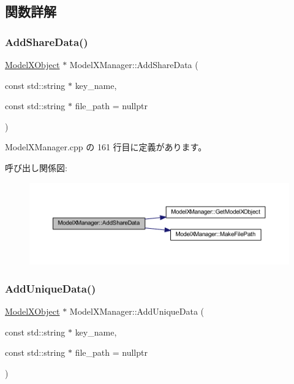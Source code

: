 \subsection{関数詳解}
\mbox{\label{class_model_x_manager_a395565622dff14d4ff80bf64611f9a36}} 
\subsubsection{\texorpdfstring{Add\+Share\+Data()}{AddShareData()}}
{\footnotesize\ttfamily \mbox{\hyperlink{class_model_x_object}{Model\+X\+Object}} $\ast$ Model\+X\+Manager\+::\+Add\+Share\+Data (\begin{DoxyParamCaption}\item[{const std\+::string $\ast$}]{key\+\_\+name,  }\item[{const std\+::string $\ast$}]{file\+\_\+path = {\ttfamily nullptr} }\end{DoxyParamCaption})\hspace{0.3cm}{\ttfamily [static]}}



 Model\+X\+Manager.\+cpp の 161 行目に定義があります。

呼び出し関係図\+:\nopagebreak
\begin{figure}[H]
\begin{center}
\leavevmode
\includegraphics[width=350pt]{class_model_x_manager_a395565622dff14d4ff80bf64611f9a36_cgraph}
\end{center}
\end{figure}
\mbox{\label{class_model_x_manager_a0a0cd728e7b92de6c18e96026708d97b}} 
\subsubsection{\texorpdfstring{Add\+Unique\+Data()}{AddUniqueData()}}
{\footnotesize\ttfamily \mbox{\hyperlink{class_model_x_object}{Model\+X\+Object}} $\ast$ Model\+X\+Manager\+::\+Add\+Unique\+Data (\begin{DoxyParamCaption}\item[{const std\+::string $\ast$}]{key\+\_\+name,  }\item[{const std\+::string $\ast$}]{file\+\_\+path = {\ttfamily nullptr} }\end{DoxyParamCaption})\hspace{0.3cm}{\ttfamily [static]}}



